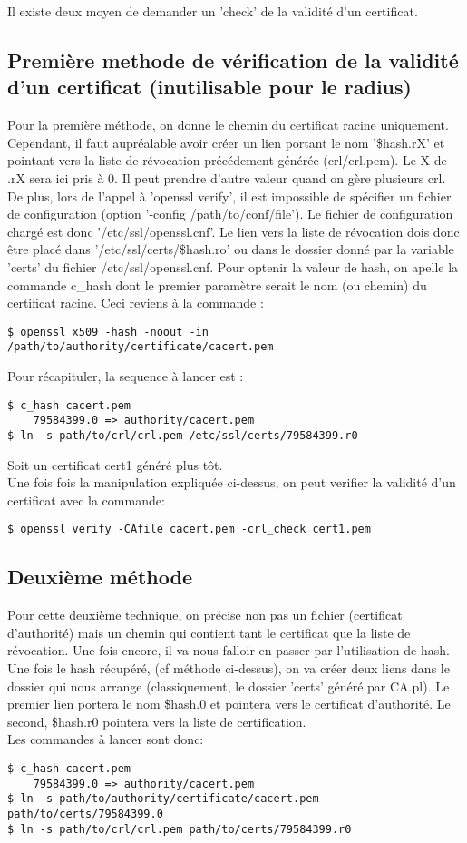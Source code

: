 Il existe deux moyen de demander un 'check' de la validité d'un certificat. 
\subsection{Première methode de vérification de la validité d'un certificat (inutilisable pour le radius)}
Pour la première méthode, on donne le chemin du certificat racine uniquement. Cependant, il faut aupréalable avoir créer un lien portant le nom '\$hash.rX' et pointant vers la liste de révocation précédement générée (crl/crl.pem). Le X de .rX sera ici pris à 0. Il peut prendre d'autre valeur quand on gère plusieurs crl. De plus, lors de l'appel à 'openssl verify', il est impossible de spécifier un fichier de configuration (option '-config /path/to/conf/file'). Le fichier de configuration chargé est donc '/etc/ssl/openssl.cnf'. Le lien vers la liste de révocation dois donc être placé dans '/etc/ssl/certs/\$hash.ro' ou dans le dossier donné par la variable 'certs' du fichier /etc/ssl/openssl.cnf. Pour optenir la valeur de hash, on apelle la commande c\_hash dont le premier paramètre serait le nom (ou chemin) du certificat racine. Ceci reviens à la commande : 
\begin{verbatim}
$ openssl x509 -hash -noout -in /path/to/authority/certificate/cacert.pem
\end{verbatim}
Pour récapituler, la sequence à lancer est : 
\begin{verbatim}
$ c_hash cacert.pem
    79584399.0 => authority/cacert.pem
$ ln -s path/to/crl/crl.pem /etc/ssl/certs/79584399.r0
\end{verbatim}
Soit un certificat cert1 généré plus tôt.\\
Une fois fois la manipulation expliquée ci-dessus, on peut verifier la validité d'un certificat avec la commande: 
\begin{verbatim}
$ openssl verify -CAfile cacert.pem -crl_check cert1.pem
\end{verbatim}

\subsection{Deuxième méthode}
Pour cette deuxième technique, on précise non pas un fichier (certificat d'authorité) mais un chemin qui contient tant le certificat que la liste de révocation. Une fois encore, il va nous falloir en passer par l'utilisation de hash.
Une fois le hash récupéré, (cf méthode ci-dessus), on va créer deux liens dans le dossier qui nous arrange (classiquement, le dossier 'certs' généré par CA.pl). Le premier lien portera le nom \$hash.0 et pointera vers le certificat d'authorité. Le second, \$hash.r0 pointera vers la liste de certification. \\
Les commandes à lancer sont donc: 
\begin{verbatim}
$ c_hash cacert.pem
    79584399.0 => authority/cacert.pem
$ ln -s path/to/authority/certificate/cacert.pem path/to/certs/79584399.0
$ ln -s path/to/crl/crl.pem path/to/certs/79584399.r0
\end{verbatim}

